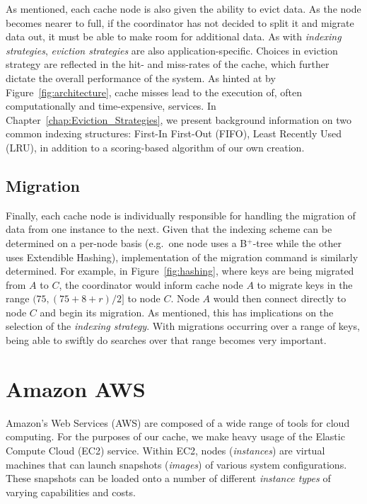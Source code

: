 As mentioned, each cache node is also given the ability to evict data. As the
node becomes nearer to full, if the coordinator has not decided to split it
and migrate data out, it must be able to make room for additional data. As with
\emph{indexing strategies}, \emph{eviction strategies} are also
application-specific. Choices in eviction strategy are reflected in the hit-
and miss-rates of the cache, which further dictate the overall performance of
the system. As hinted at by Figure~\ref{fig:architecture}, cache misses lead to
the execution of, often computationally and time-expensive, services. In
Chapter~\ref{chap:Eviction_Strategies}, we present background information on two
common indexing structures: First-In First-Out (FIFO), Least Recently Used
(LRU), in addition to a scoring-based algorithm of our own creation.


\subsection{Migration} %
\label{sub:cache_migration}

Finally, each cache node is individually responsible for handling the migration
of data from one instance to the next. Given that the indexing scheme can be
determined on a per-node basis (e.g.\ one node uses a B$^+$-tree while the
other uses Extendible Hashing), implementation of the migration command is
similarly determined. For example, in Figure~\ref{fig:hashing}, where keys are
being migrated from $A$ to $C$, the coordinator would inform cache node $A$ to
migrate keys in the range $(75,(75 + 8 + r)/2]$ to node $C$. Node $A$ would
then connect directly to node $C$ and begin its migration. As mentioned, this
has implications on the selection of the \emph{indexing strategy}. With
migrations occurring over a range of keys, being able to swiftly do searches
over that range becomes very important.



\section{Amazon AWS} %
\label{sec:Amazon_AWS}
Amazon's Web Services (AWS) are composed of a wide range of tools for cloud
computing. For the purposes of our cache, we make heavy usage of the Elastic
Compute Cloud (EC2) service. Within EC2, nodes (\emph{instances}) are virtual
machines that can launch snapshots (\emph{images}) of various system
configurations. These snapshots can be loaded onto a number of different
\emph{instance types} of varying capabilities and costs.

